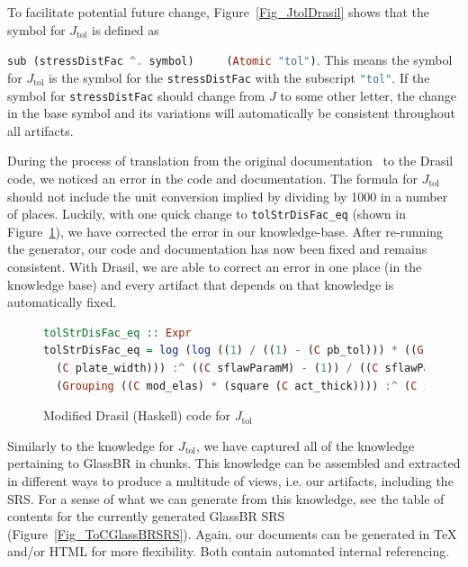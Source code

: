 \documentclass[sigconf]{acmart}
\newcommand{\jtol}{$J_{\mbox{tol}}$}
\newcommand{\inlHask}[1]{\lstinline[language=Haskell, columns=fullflexible,
  basicstyle=\ttfamily, showstringspaces=false, breaklines=true]{#1}}
\begin{document}
To facilitate potential future change, Figure~\ref{Fig_JtolDrasil} shows that
the symbol for \jtol{} is defined as {\inlHask{sub (stressDistFac ^. symbol)
    (Atomic "tol")}.  This means the symbol for \jtol{} is the symbol for the
  {\inlHask{stressDistFac}} with the subscript {\inlHask{"tol"}}.  If the symbol
  for {\inlHask{stressDistFac}} should change from $J$ to some other letter, the
  change in the base symbol and its variations will automatically be consistent
  throughout all artifacts.

During the process of translation from the original
documentation~\cite{SmithJegatheesanAndKelly2016} to the Drasil code, we noticed
an error in the code and documentation. The formula for \jtol{} should not
include the unit conversion implied by dividing by 1000 in a number of
places. Luckily, with one quick change to {\inlHask{tolStrDisFac_eq}} (shown in
Figure~\ref{Fig_JtolDrasil_fix}), we have corrected the error in our
knowledge-base. After re-running the generator, our code and documentation has
now been fixed and remains consistent.  With Drasil, we are able to correct an
error in one place (in the knowledge base) and every artifact that depends on
that knowledge is automatically fixed.

\begin{figure}
\begin{lstlisting}[language=Haskell, frame=single, showstringspaces=false]
tolStrDisFac_eq :: Expr
tolStrDisFac_eq = log (log ((1) / ((1) - (C pb_tol))) * ((Grouping ((C plate_len) * 
  (C plate_width))) :^ ((C sflawParamM) - (1)) / ((C sflawParamK) * 
  (Grouping ((C mod_elas) * (square (C act_thick)))) :^ (C sflawParamM) * (C loadDF))))
\end{lstlisting}
\caption{Modified Drasil (Haskell) code for \jtol{}}
\label{Fig_JtolDrasil_fix}
\end{figure}

Similarly to the knowledge for \jtol{}, we have captured all of the knowledge
pertaining to GlassBR in chunks.  This knowledge can be assembled and extracted
in different ways to produce a multitude of views, i.e. our artifacts, including
the SRS. For a sense of what we can generate from this knowledge, see the table
of contents for the currently generated GlassBR SRS
(Figure~\ref{Fig_ToCGlassBRSRS}). Again, our documents can be generated in TeX
and/or HTML for more flexibility. Both contain automated internal referencing.

}
\end{document}
